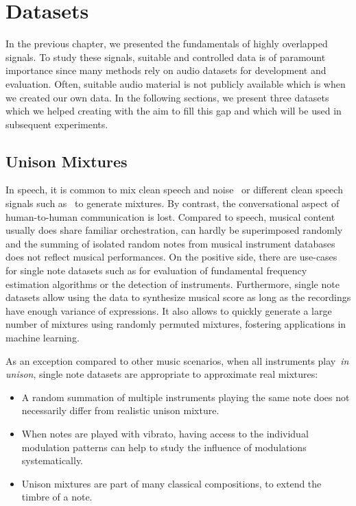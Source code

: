 \chapter{Datasets}
\label{cha:datasets}

In the previous chapter, we presented the fundamentals of highly overlapped signals.
To study these signals, suitable and controlled data is of paramount importance since many methods rely on audio datasets for development and evaluation.
Often, suitable audio material is not publicly available which is when we created our own data.
In the following sections, we present three datasets which we helped creating with the aim to fill this gap and which will be used in subsequent experiments.

\section{Unison Mixtures}
\label{sec:unison_dataset}


In speech, it is common to mix clean speech and noise~\cite{varga93} or different clean speech signals such as~\cite{garofolo93} to generate mixtures.
By contrast, the conversational aspect of human-to-human communication is lost.
Compared to speech, musical content usually does share familiar orchestration, can hardly be superimposed randomly and the summing of isolated random notes from musical instrument databases does not reflect musical performances.
On the positive side, there are use-cases for single note datasets such as for evaluation of fundamental frequency estimation algorithms or the detection of instruments.
Furthermore, single note datasets allow using the data to synthesize musical score as long as the recordings have enough variance of expressions.
It also allows to quickly generate a large number of mixtures using randomly permuted mixtures, fostering applications in machine learning.

As an exception compared to other music scenarios, when all instruments play~\emph{in unison}, single note datasets are appropriate to approximate real mixtures:

\begin{itemize}
  \item A random summation of multiple instruments playing the same note does not necessarily differ from realistic unison mixture.
  \item When notes are played with vibrato, having access to the individual modulation patterns can help to study the influence of modulations systematically.
  \item Unison mixtures are part of many classical compositions, to extend the timbre of a note.
\end{itemize}

